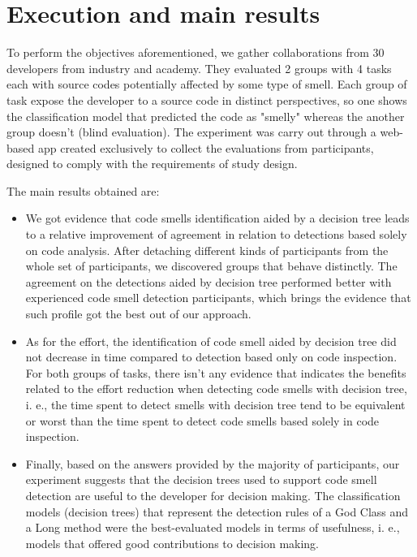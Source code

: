 \section{Execution and main results}

To perform  the objectives aforementioned,  we gather collaborations from 30  developers from industry and academy. They evaluated 2 groups with 4 tasks each with source codes potentially affected by some type of smell. Each group of task expose the developer to a source code in distinct perspectives, so one shows the classification model that predicted the code as "smelly" whereas the another group doesn't (blind evaluation).  The experiment was carry out through a web-based app created exclusively to collect the evaluations from participants, designed to comply with the requirements of study design.

The main results obtained are:

\begin{itemize}
    \item We got evidence that code smells identification aided by a decision tree leads to a  relative improvement of agreement in relation to detections based solely on code analysis. After detaching different kinds of participants from the whole set of participants, we discovered groups that behave distinctly. The agreement on the detections aided by decision tree performed better with experienced code smell detection participants, which brings the evidence that such profile got the best out of our approach.

    \item As for the effort, the identification of code smell aided by decision tree did not decrease in time compared to detection based only on code inspection. For both groups of tasks, there isn’t any evidence that indicates the benefits related to the effort reduction when detecting code smells with decision tree, i. e., the time spent to detect smells with decision tree tend to be equivalent or worst than the time spent to detect code smells based solely in code inspection. 
    
    \item Finally, based on the answers provided by the majority of participants, our experiment suggests that the decision trees used to support code smell detection are useful to the developer for decision making. The classification models (decision trees) that represent the detection rules of a God Class and a Long method were the best-evaluated models in terms of usefulness, i. e., models that offered good contributions to decision making.
\end{itemize}



